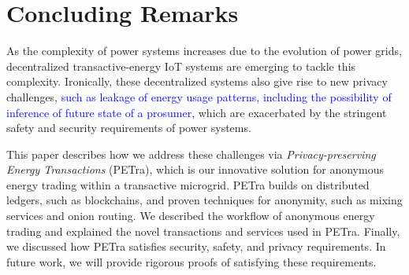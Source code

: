 \section{Concluding Remarks}
\label{sec:concl}

As the complexity of power systems increases due to the evolution of
power grids, decentralized transactive-energy IoT systems are emerging
to tackle this complexity. Ironically, these decentralized systems
also give rise to new privacy challenges, \textcolor{blue}{such as leakage of energy usage patterns, including the possibility of inference of future state of a prosumer}, 
which are exacerbated by the stringent safety and
security requirements of power systems.

This paper describes how we address these challenges via
\emph{Privacy-preserving Energy Transactions} (PETra), which is our
innovative solution for anonymous energy trading within a transactive
microgrid.  PETra builds on distributed ledgers, such as blockchains,
and proven techniques for anonymity, such as mixing services and onion
routing.  We described the workflow of anonymous energy trading and
explained the novel transactions and services used in PETra.  Finally,
we discussed how PETra satisfies security, safety, and privacy
requirements.  In future work, we will provide rigorous proofs of
satisfying these requirements.
